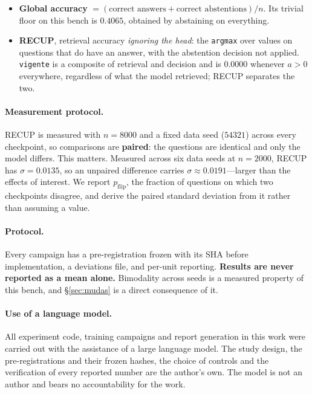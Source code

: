 \documentclass[11pt,a4paper]{article}
\begin{document}
\begin{itemize}
\item \textbf{Global accuracy} $= (\text{correct answers} + \text{correct abstentions}) / n$. Its
trivial floor on this bench is $\mathbf{0.4065}$, obtained by abstaining on everything.
\item \textbf{RECUP}, retrieval accuracy \emph{ignoring the head}: the \texttt{argmax} over values on
questions that do have an answer, with the abstention decision not applied. \texttt{vigente} is a
composite of retrieval and decision and is $0.0000$ whenever $a > 0$ everywhere, regardless of what
the model retrieved; RECUP separates the two.
\end{itemize}

\paragraph{Measurement protocol.} RECUP is measured with $n = 8000$ and a fixed data seed
($54321$) across every checkpoint, so comparisons are \textbf{paired}: the questions are identical
and only the model differs. This matters. Measured across six data seeds at $n=2000$, RECUP has
$\sigma = 0.0135$, so an unpaired difference carries $\sigma \approx 0.0191$---larger than the
effects of interest. We report $p_{\mathrm{flip}}$, the fraction of questions on which two
checkpoints disagree, and derive the paired standard deviation from it rather than assuming a value.

\paragraph{Protocol.} Every campaign has a pre-registration frozen with its SHA before implementation,
a deviations file, and per-unit reporting. \textbf{Results are never reported as a mean alone.}
Bimodality across seeds is a measured property of this bench, and \S\ref{sec:mudas} is a direct
consequence of it.

\paragraph{Use of a language model.} All experiment code, training campaigns and report generation in
this work were carried out with the assistance of a large language model. The study design, the
pre-registrations and their frozen hashes, the choice of controls and the verification of every
reported number are the author's own. The model is not an author and bears no accountability for the
work.
\end{document}
